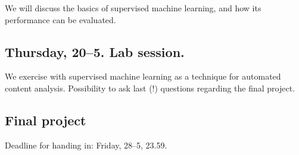 We will discuss the basics of supervised machine learning, and how its performance can be evaluated. 

\subsection*{Thursday, 20--5. Lab session.}
We exercise with supervised machine learning as a technique for automated content analysis. Possibility to ask last (!) questions regarding the final project.

\subsection*{Final project}
Deadline for handing in: Friday, 28--5, 23.59.



